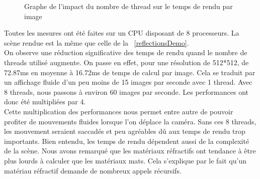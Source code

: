 \documentclass[11pt]{article}
\begin{document}
\begin{figure}[h!]
	
	\caption{Graphe de l'impact du nombre de thread sur le temps de rendu par image}
	\label{graphMultithreading}
\end{figure}
\FloatBarrier
Toutes les mesures ont été faites sur un CPU disposant de 8 processeurs. La scène rendue est la même que celle de la \figurename\ \ref{reflectionsDemo}.\\
On observe une réduction significative des temps de rendu quand le nombre de threads utilisé augmente. On passe en effet, pour une résolution de 512*512, de 72.87ms en moyenne à 16.72ms de temps de calcul par image. Cela se traduit par un affichage fluide d'un peu moins de 15 images par seconde avec 1 thread. Avec 8 threads, nous passons à environ 60 images par seconde. Les performances ont donc été multipliées par 4.\\
Cette multiplication des performances nous permet entre autre de pouvoir profiter de mouvements fluides lorsque l'on déplace la caméra. Sans ces 8 threads, les mouvement seraient saccadés et peu agréables dû aux temps de rendu trop importants. Bien entendu, les temps de rendu dépendent aussi de la complexité de la scène. Nous avons remarqué que les matériaux réfractifs ont tendance à être plus lourds à calculer que les matériaux mats. Cela s'explique par le fait qu'un matériau réfractif demande de nombreux appels récursifs.
\end{document}

